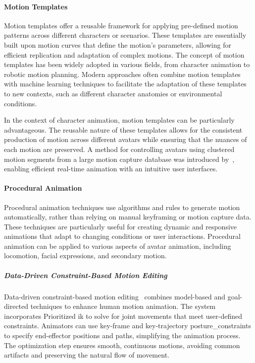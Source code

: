 \documentclass[../../main.tex]{subfiles}
\begin{document}
\paragraph{Motion Templates}
\label{ch:background_work:sign_language_synthesis:3d_techniques:avatar_animation:motion_templates}

Motion templates offer a reusable framework for applying pre-defined motion patterns across different characters or scenarios. These templates are essentially built upon motion curves that define the motion's parameters, allowing for efficient replication and adaptation of complex motions. The concept of motion templates has been widely adopted in various fields, from character animation to robotic motion planning. Modern approaches often combine motion templates with machine learning techniques to facilitate the adaptation of these templates to new contexts, such as different character anatomies or environmental conditions.

In the context of character animation, motion templates can be particularly advantageous. The reusable nature of these templates allows for the consistent production of motion across different avatars while ensuring that the nuances of each motion are preserved. A method for controlling avatars using clustered motion segments from a large motion capture database was introduced by~\cite{10.1145/566654.566607}, enabling efficient real-time animation with an intuitive user interfaces.

\paragraph{Procedural Animation}
\label{ch:background_work:sign_language_synthesis:3d_techniques:avatar_animation:procedural_animation}

Procedural animation techniques use algorithms and rules to generate motion automatically, rather than relying on manual keyframing or motion capture data. These techniques are particularly useful for creating dynamic and responsive animations that adapt to changing conditions or user interactions. Procedural animation can be applied to various aspects of avatar animation, including locomotion, facial expressions, and secondary motion.

\subparagraph{Data-Driven Constraint-Based Motion Editing}
\label{ch:background_work:sign_language_synthesis:3d_techniques:avatar_animation:procedural_techniques:data_driven_constraint_based_motion_editing}

Data-driven constraint-based motion editing~\cite{inbook} combines model-based and goal-directed techniques to enhance human motion animation. The system incorporates Prioritized \gls{ik} to solve for joint movements that meet user-defined constraints. Animators can use key-frame and key-trajectory \gls{posture_constraint}s to specify end-effector positions and paths, simplifying the animation process. The optimization step ensures smooth, continuous motions, avoiding common artifacts and preserving the natural flow of movement.
\end{document}
